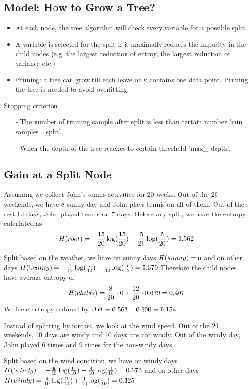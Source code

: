 \documentclass[12pt, oneside]{article}
\begin{document}
\subsection{Model: How to Grow a Tree?}
\begin{itemize}
\item At each node, the tree algorithm will check every variable for a possible split. 
\item A variable is selected for the split if it maximally reduces the impurity in the child nodes (e.g. the largest reduction of entroy, the largest reduction of variance etc.)
\item Pruning: a tree can grow till each leave only contains one data point. Pruning the tree is needed to avoid overfitting.
\end{itemize}

Stopping criterion
\begin{itemize}
\item[-] The number of training sample after split is less than certain number 'min\_ samples\_ split'.
\item[-] When the depth of the tree reaches to certain threshold 'max\_ depth'.
\end{itemize}

\subsection{ Gain at a Split Node}
Assuming we collect John's tennis activities for 20 weeks. Out of the 20 weekends, we have 8 sunny day and John plays tennis on all of them. Out of the rest 12 days, John played tennis on 7 days. 
Before any split, we have the entropy calculated as 
$$
\mathnormal{H(root)}=-\frac{15}{20}\log(\frac{15}{20})-\frac{5}{20}\log(\frac{5}{20})=0.562
$$

Split based on the weather, we have on sunny days
$
 \mathnormal{H(sunny)=0}
$
and on other days
$
\mathnormal{H(!sunny)}=-\frac{7}{12}\log(\frac{7}{12})-\frac{5}{12}\log(\frac{5}{12})=0.679
$
Therefore the child nodes have average entropy of 
$$
\mathnormal{H(childs)}=\frac{8}{20}\cdot 0+\frac{12}{20}\cdot 0.679=0.407
$$
We have entropy reduced by $\mathnormal{\Delta H}=0.562-0.390=0.154$

Instead of splitting by forcast, we look at the wind speed. Out of the 20 weekends, 10 days are windy and 10 days are not windy. Out of the windy day, John played 6 times and 9 times for the non-windy days.

Split based on the wind condition, we have on windy days
$
\mathnormal{H(!windy)}=-\frac{6}{10}\log(\frac{6}{10})-\frac{4}{10}\log(\frac{4}{10})=0.673
$
and on other days
$
\mathnormal{H(windy)}=\frac{9}{10} \log(\frac{9}{10})+\frac{1}{10} \log(\frac{1}{10})=0.325
$
\end{document}
